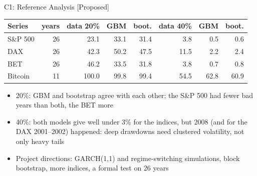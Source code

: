 \ifsolutions
\begin{frame}{C1: Reference Analysis [Proposed]}
\itemsize{\footnotesize}
\begin{center}
\footnotesize
\begin{tabular}{lrrrrrrr}
\toprule
Series & years & data 20\% & GBM & boot. & data 40\% & GBM & boot. \\
\midrule
S\&P 500 & 26 & 23.1 & 33.1 & 31.4 & 3.8 & 0.5 & 0.6 \\
DAX & 26 & 42.3 & 50.2 & 47.5 & 11.5 & 2.2 & 2.4 \\
BET & 26 & 46.2 & 33.5 & 31.8 & 3.8 & 0.7 & 0.8 \\
Bitcoin & 11 & 100.0 & 99.8 & 99.4 & 54.5 & 62.8 & 60.9 \\
\bottomrule
\end{tabular}
\end{center}
\begin{itemize}
    \item 20\%: GBM and bootstrap agree with each other; the S\&P 500 had fewer bad years than both, the BET more
    \item 40\%: both models give well under 3\% for the indices, but 2008 (and for the DAX 2001--2002) happened: deep drawdowns need clustered volatility, not only heavy tails
    \item Project directions: GARCH(1,1) and regime-switching simulations, block bootstrap, more indices, a formal test on 26 years
\end{itemize}
\end{frame}
\fi

